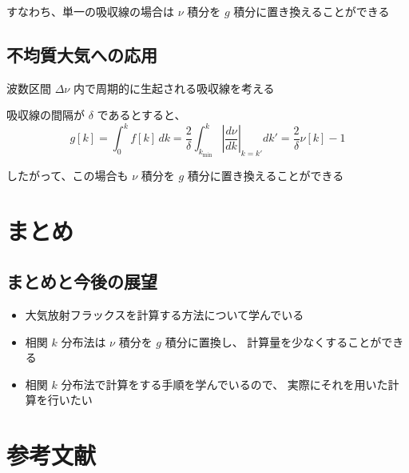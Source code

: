 \documentclass[article]{dennou777}
\begin{document}
すなわち、単一の吸収線の場合は $\nu$ 積分を $g$ 積分に置き換えることができる

\subsection{不均質大気への応用}
波数区間 $\Delta\nu$ 内で周期的に生起される吸収線を考える

吸収線の間隔が $\delta$ であるとすると、
\[
	g[k]=\int^k_0 f[k]\,dk
	=\frac{2}{\delta}\int^k_{k_{\mathrm{min}}}\left|\frac{d\nu}{dk}\right|_{k=k'}dk'
	=\frac{2}{\delta}\nu[k]-1
\]

したがって、この場合も $\nu$ 積分を $g$ 積分に置き換えることができる

\section{まとめ}

\subsection{まとめと今後の展望}
\begin{itemize}
	\item 大気放射フラックスを計算する方法について学んでいる
	\item 相関 $k$ 分布法は $\nu$ 積分を $g$ 積分に置換し、
		計算量を少なくすることができる
\end{itemize}

\begin{itemize}
	\item 相関 $k$ 分布法で計算をする手順を学んでいるので、
		実際にそれを用いた計算を行いたい
\end{itemize}

\section{参考文献}
\end{document}

